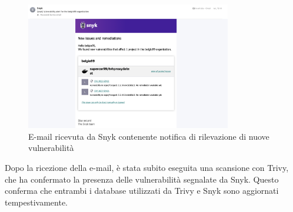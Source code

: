 \begin{figure}[H]
   \centering
   \includegraphics[width=0.8\textwidth]{immagini/capitolo2/snyk_email.png}
   \caption{E-mail ricevuta da Snyk contenente notifica di rilevazione di nuove vulnerabilità}
   \label{fig:snyk_email}
\end{figure}

Dopo la ricezione della e-mail, è stata subito eseguita una scansione con Trivy, che ha confermato la presenza delle vulnerabilità segnalate da Snyk. Questo conferma che entrambi i database utilizzati da Trivy e Snyk sono aggiornati tempestivamente.